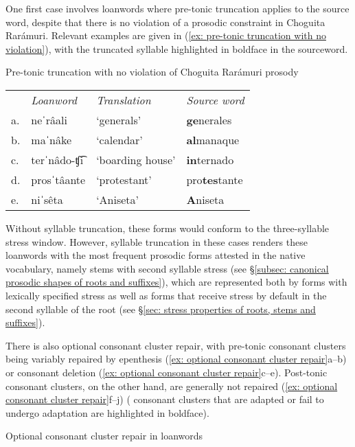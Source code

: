 One first case involves loanwords where pre-tonic truncation applies to the source word, despite that there is no violation of a prosodic constraint in Choguita Rarámuri. Relevant examples are given in (\ref{ex: pre-tonic truncation with no violation}), with the truncated syllable highlighted in boldface in the  sourceword.

\ea\label{ex: pre-tonic truncation with no violation}
{Pre-tonic truncation with no violation of Choguita Rarámuri prosody}

\begin{tabular}{llll}
    & \textit{Loanword} & \textit{Translation} & \textit{Source word} \\
     a.& neˈrâali &  `generals' & \textbf{ge}nerales\\
     b.& maˈnâke &  `calendar' & \textbf{al}manaque\\
     c.& terˈnâdo-ʧ͡i & `boarding house' & \textbf{in}ternado \\
     d.& prosˈtâante &  `protestant' & {pro\textbf{tes}tante} \\
     e.& niˈsêta &  `Aniseta' & \textbf{A}niseta \\
\end{tabular}
    \z

Without syllable truncation, these forms would conform to the three-syllable stress window. However, syllable truncation in these cases renders these loanwords with the most frequent prosodic forms attested in the native vocabulary, namely stems with second syllable stress (see §\ref{subsec: canonical prosodic shapes of roots and suffixes}), which are represented both by forms with lexically specified stress as well as forms that receive stress by default in the second syllable of the root (see §\ref{sec: stress properties of roots, stems and suffixes}).

There is also optional consonant cluster repair, with pre-tonic consonant clusters being variably repaired by epenthesis (\ref{ex: optional consonant cluster repair}a--b) or consonant deletion (\ref{ex: optional consonant cluster repair}c--e). Post-tonic consonant clusters, on the other hand, are generally not repaired (\ref{ex: optional consonant cluster repair}f--j) ( consonant clusters that are adapted or fail to undergo adaptation are highlighted in boldface).

\ea\label{ex: optional consonant cluster repair}
{Optional consonant cluster repair in loanwords}

